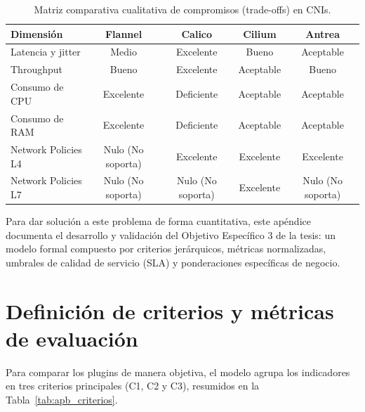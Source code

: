 \begin{table}[htbp]
\centering
\scriptsize
\caption{Matriz comparativa cualitativa de compromisos (trade-offs) en CNIs.}
\label{tab:apb_tradeoffs}
\begin{tabularx}{\textwidth}{|Y|c|c|c|c|}
\hline
\textbf{Dimensión} & \textbf{Flannel} & \textbf{Calico} & \textbf{Cilium} & \textbf{Antrea} \\
\hline
Latencia y jitter & Medio & Excelente & Bueno & Aceptable \\
Throughput & Bueno & Excelente & Aceptable & Bueno \\
Consumo de CPU & Excelente & Deficiente & Aceptable & Aceptable \\
Consumo de RAM & Excelente & Deficiente & Aceptable & Aceptable \\
Network Policies L4 & Nulo (No soporta) & Excelente & Excelente & Excelente \\
Network Policies L7 & Nulo (No soporta) & Nulo (No soporta) & Excelente & Nulo (No soporta) \\
\hline
\end{tabularx}
\end{table}

Para dar solución a este problema de forma cuantitativa, este apéndice documenta el desarrollo y validación del Objetivo Específico 3 de la tesis: un modelo formal compuesto por criterios jerárquicos, métricas normalizadas, umbrales de calidad de servicio (SLA) y ponderaciones específicas de negocio.

\section{Definición de criterios y métricas de evaluación} \label{sec:apb_criterios}

Para comparar los plugins de manera objetiva, el modelo agrupa los indicadores en tres criterios principales (C1, C2 y C3), resumidos en la Tabla~\ref{tab:apb_criterios}.

